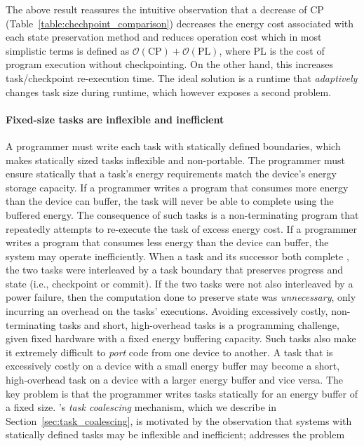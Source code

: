The above result reassures the intuitive observation that a decrease of CP
(Table~\ref{table:chechpoint_comparison}) decreases the energy cost associated
with each state preservation method and reduces operation cost which in most
simplistic terms is defined as $\mathcal{O}(\text{CP})+\mathcal{O}(\text{PL})$,
where PL is the cost of program execution without checkpointing. On the other
hand, this increases task/checkpoint re-execution time. The ideal solution is a
runtime that \emph{adaptively} changes task size during runtime, which however
exposes a second problem.

\paragraph{Fixed-size tasks are inflexible and inefficient} 
A programmer must write each task with statically defined boundaries, which
makes statically sized tasks inflexible and non-portable.  The programmer must
ensure statically that a task's energy requirements match the device's energy
storage capacity.  If a programmer writes a program that consumes more energy
than the device can buffer, the task will never be able to complete using the
buffered energy. The consequence of such tasks is a non-terminating program
that repeatedly attempts to re-execute the task of excess energy cost.  If a
programmer writes a program that consumes less energy than the device can
buffer, the system may operate inefficiently. When a task and its successor
both complete , the two tasks were interleaved by a task boundary that
preserves progress and state (i.e., checkpoint or commit).  If the two tasks
were not also interleaved by a power failure, then the computation done to
preserve state was {\em unnecessary}, only incurring an overhead on the tasks'
executions.   
%
Avoiding excessively costly, non-terminating tasks and short, high-overhead
tasks is a programming challenge, given fixed hardware with a fixed energy
buffering capacity.   Such tasks also make it extremely difficult to {\em port}
code from  one device to another. A task that is excessively costly on a device
with a small energy buffer may become a short, high-overhead task  on a device
with a larger energy buffer and vice versa. The key problem is that the programmer
writes tasks statically for an energy buffer of a fixed size.
%
\sys's {\em task coalescing} mechanism, which we describe in
Section~\ref{sec:task_coalescing}, is motivated by the observation that systems
with statically defined tasks may be inflexible and inefficient; \sys addresses
the problem 


